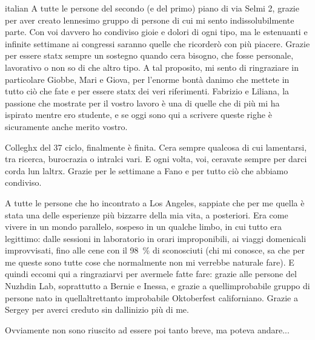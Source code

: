 \begin{otherlanguage*}{italian}
A tutte le persone del secondo (e del primo) piano di via Selmi 2, grazie per aver creato l\curlyapostrophe{}ennesimo gruppo di persone di cui mi sento indissolubilmente parte. Con voi davvero ho condiviso gioie e dolori di ogni tipo, ma le estenuanti e infinite settimane ai congressi saranno quelle che ricorderò con più piacere. Grazie per essere statx sempre un sostegno quando c\curlyapostrophe{}era bisogno, che fosse personale, lavorativo o non so di che altro tipo. A tal proposito, mi sento di ringraziare in particolare Giobbe, Mari e Giova, per l'enorme bontà d\curlyapostrophe{}animo che mettete in tutto ciò che fate e per essere statx dei veri riferimenti. Fabrizio e Liliana, la passione che mostrate per il vostro lavoro è una di quelle che di più mi ha ispirato mentre ero studente, e se oggi sono qui a scrivere queste righe è sicuramente anche merito vostro. 

Colleghx del 37\textdegree{} ciclo, finalmente è finita. C\curlyapostrophe{}era sempre qualcosa di cui lamentarsi, tra ricerca, burocrazia o intralci vari. E ogni volta, voi, c\curlyapostrophe{}eravate sempre per darci corda l\curlyapostrophe{}un l\curlyapostrophe{}altrx. Grazie per le settimane a Fano e per tutto ciò che abbiamo condiviso.

A tutte le persone che ho incontrato a Los Angeles, sappiate che per me quella è stata una delle esperienze più bizzarre della mia vita, a posteriori. Era come vivere in un mondo parallelo, sospeso in un qualche limbo, in cui tutto era legittimo: dalle sessioni in laboratorio in orari improponibili, ai viaggi domenicali improvvisati, fino alle cene con il \qty{98}{\percent} di sconosciuti (chi mi conosce, sa che per me queste sono tutte cose che normalmente non mi verrebbe naturale fare). E quindi eccomi qui a ringraziarvi per avermele fatte fare: grazie alle persone del Nuzhdin Lab, soprattutto a Bernie e Inessa, e grazie a quell\curlyapostrophe{}improbabile gruppo di persone nato in quell\curlyapostrophe{}altrettanto improbabile Oktoberfest californiano. Grazie a Sergey per averci creduto sin dall\curlyapostrophe{}inizio più di me.

Ovviamente non sono riuscito ad essere poi tanto breve, ma poteva andare...
\end{otherlanguage*}